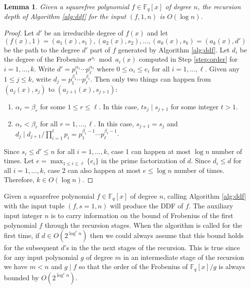 \documentclass[12pt]{article}
\theoremstyle{plain}
\newtheorem{lemma}[theorem]{Lemma}
\theoremstyle{definition}
\def\F{\ensuremath{\mathbb{F}}}
\begin{document}
\begin{lemma}
	\label{lem:depth}
	Given a squarefree polynomial $f \in \F_q[x]$ of degree $n$, the recursion depth of Algorithm 
	\ref{alg:ddf} for the input $(f, 1, n)$ is $O(\log n)$.
\end{lemma}
\begin{proof}
	Let $d'$ be an irreducible degree of $f(x)$ and let $(f(x), 1) = (a_1(x), s_1), (a_2(x), s_2), 
	\dots, (a_k(x), s_k) = (a_k(x), d')$ be the path to the degree $d'$ part of $f$ generated by 
	Algorithm \ref{alg:ddf}. Let $d_i$ be the degree of the Frobenius $\sigma^{s_i} \bmod a_i(x)$ 
	computed in Step \ref{step:order} for $i = 1, \dots, k$. Write $d' = p_1^{\alpha_1} \cdots 
	p_\ell^{\alpha_\ell}$ where $0 \le \alpha_i \le e_i$ for all $i = 1, \dots, \ell$. Given any 
	$1 \le j \le k$, write $d_j = p_1^{\beta_1} \cdots p_\ell^{\beta_\ell}$. Then only two things 
	can happen from $(a_j(x), s_j)$ to $(a_{j + 1}(x), s_{j + 1})$:
	\begin{enumerate}
		\item $\alpha_r = \beta_r$ for some $1 \le r \le \ell$. In this case, $ts_j \mid s_{j + 1}$ 
		for some integer $t > 1$.
		\item $\alpha_r < \beta_r$ for all $r = 1, \dots, \ell$. In this case, $s_{j + 1} = s_j$ 
		and $d_j \mid d_{j + 1} / \prod_{i = 1}^\ell p_i = p_1^{\beta_1 - 1} \cdots 
		p_\ell^{\beta_\ell - 1}$.
	\end{enumerate}
	Since $s_i \le d' \le n$ for all $i = 1, \dots, k$, case 1 can happen at most $\log n$ 
	number of times. Let $e = \max_{1 \le i \le \ell}\{ e_i \}$ in the prime factorization of $d$. 
	Since $d_i \le d$ for all $i = 1, \dots, k$, case 2 can also happen at most $e \le \log n$ 
	number of times. Therefore, $k \in O(\log n)$.
\end{proof}
Given a squarefree polynomial $f \in \F_q[x]$ of degree $n$, calling Algorithm \ref{alg:ddf} with 
the input tuple $(f, s = 1, n)$ will produce the DDF of $f$. The auxiliary input integer $n$ is to 
carry information on the bound of Frobenius of the first polynomial $f$ through the recursion 
stages. When the algorithm is called for the first time, if $d \in O(2^{\log^cn})$ then we 
could always assume that this bound holds for the subsequent $d$'s in the the next stages of the 
recursion. This is true since for any input polynomial $g$ of degree $m$ in an intermediate stage 
of the recursion we have $m < n$ and $g \mid f$ so that the order of the Frobenius of $\F_q[x] / g$ 
is always bounded by $O(2^{\log^cn})$. 
\end{document}
